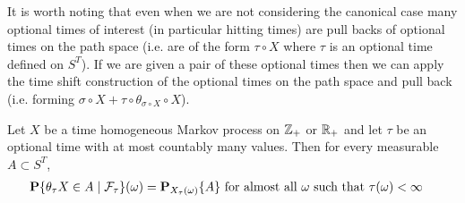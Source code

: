 It is worth noting that even when we are not considering the canonical
case many optional times of interest (in particular hitting times) are
pull backs of optional times on the path space (i.e. are of the form
$\tau \circ X$ where $\tau$ is an optional time defined on $S^T$).  If
we are given a pair of these optional times then we can
apply the time shift construction of the optional times on the path
space and pull back (i.e. forming $\sigma \circ X + \tau \circ
\theta_{\sigma \circ X} \circ X$).  

\begin{lem}Let $X$ be a time homogeneous Markov process on
  $\integers_+$ or $\reals_+$ and let $\tau$ be an optional
  time with at most countably many values.  Then for every measurable
  $A \subset S^T$,
\begin{align*}
\cprobability{\mathcal{F}_\tau}{\theta_\tau X \in A}(\omega) &=
\sprobability{A}{X_\tau(\omega)} \text{ for almost all $\omega$ such that $\tau(\omega) < \infty$}
\end{align*}
\end{lem}
